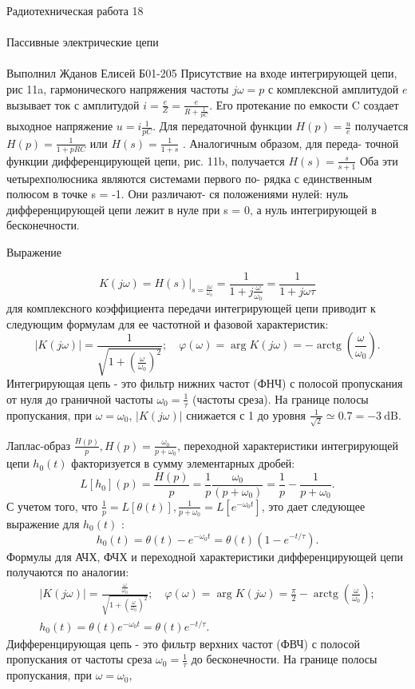 \documentclass{astroedu-lab}
\begin{document}
\begin{problem}{\huge Радиотехническая работа 18\\\\Пассивные электрические цепи\\\\Выполнил Жданов Елисей Б01-205}
Присутствие на входе интегрирующей цепи, рис 11a, гармонического напряжения частоты $j \omega = p$ с комплексной амплитудой $e$ вызывает ток с амплитудой $i = \frac{e}{Z} = \frac{e}{R + \frac{1}{p C}}$. Его протекание по емкости C создает выходное напряжение $u = i \frac{1}{p C}$. Для передаточной функции $H(p) = \frac{u}{e}$ получается $H(p) = \frac{1}{1 + p R C}$ или $H(s) = \frac{1}{1 + s}$
. Аналогичным образом, для переда-
точной функции дифференцирующей цепи, рис. 11b, получается
$H(s) = \frac{s}{s+1}$
Оба эти четырехполюсника являются системами первого по-
рядка с единственным полюсом в точке s = -1. Они различают-
ся положениями нулей: нуль дифференцирующей цепи лежит в
нуле при s = 0, а нуль интегрирующей в бесконечности.


Выражение

$$
K(j \omega)=\left.H(s)\right|_{s=\frac{j \omega}{\omega_0}}=\frac{1}{1+j \frac{\omega}{\omega_0}}=\frac{1}{1+j \omega \tau}
$$
для комплексного коэффициента передачи интегрирующей цепи приводит к следующим формулам для ее частотной и фазовой характеристик:
$$
|K(j \omega)|=\frac{1}{\sqrt{1+\left(\frac{\omega}{\omega_0}\right)^2}} ; \quad \varphi(\omega)=\arg K(j \omega)=-\operatorname{arctg}\left(\frac{\omega}{\omega_0}\right) .
$$
Интегрирующая цепь - это фильтр нижних частот (ФНЧ) с полосой пропускания от нуля до граничной частоты $\omega_0=\frac{1}{\tau}$ (частоты среза). На границе полосы пропускания, при $\omega=\omega_0$, $|K(j \omega)|$ снижается с 1 до уровня $\frac{1}{\sqrt{2}} \simeq 0.7=-3 \mathrm{~dB}$.

Лаплас-образ $\frac{H(p)}{p}, H(p)=\frac{\omega_0}{p+\omega_0}$, переходной характеристики интегрирующей цепи $h_0(t)$ факторизуется в сумму элементарных дробей:
$$
L\left[h_0\right](p)=\frac{H(p)}{p}=\frac{1}{p} \frac{\omega_0}{\left(p+\omega_0\right)}=\frac{1}{p}-\frac{1}{p+\omega_0} .
$$
С учетом того, что $\frac{1}{p}=L[\theta(t)], \frac{1}{p+\omega_0}=L\left[e^{-\omega_0 t}\right]$, это дает следующее выражение для $h_0(t)$ :
$$
h_0(t)=\theta(t)-e^{-\omega_0 t}=\theta(t)\left(1-e^{-t / \tau}\right) .
$$
Формулы для АЧХ, ФЧХ и переходной характеристики дифференцирующей цепи получаются по аналогии:
$$
\begin{gathered}
|K(j \omega)|=\frac{\frac{\omega}{\omega_0}}{\sqrt{1+\left(\frac{\omega}{\omega_0}\right)^2}} ; \quad \varphi(\omega)=\arg K(j \omega)=\frac{\pi}{2}-\operatorname{arctg}\left(\frac{\omega}{\omega_0}\right) ; \\
h_0(t)=\theta(t) e^{-\omega_0 t}=\theta(t) e^{-t / \tau} .
\end{gathered}
$$
Дифференцирующая цепь - это фильтр верхних частот (ФВЧ) с полосой пропускания от частоты среза $\omega_0=\frac{1}{\tau}$ до бесконечности. На границе полосы пропускания, при $\omega=\omega_0$,


\end{problem}
\end{document}
